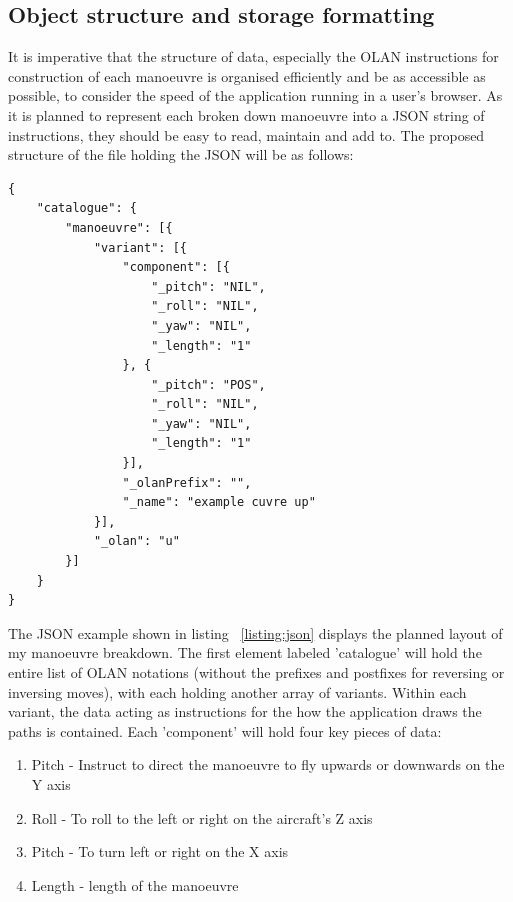 \subsection{Object structure and storage formatting}
It is imperative that the structure of data, especially the OLAN instructions for construction of each manoeuvre is organised efficiently and be as accessible as possible, to consider the speed of the application running in a user's browser. As it is planned to represent each broken down manoeuvre into a JSON string of instructions, they should be easy to read, maintain and add to. The proposed structure of the file holding the JSON will be as follows:

\lstset{language=JavaScript}
\medskip
\begin{lstlisting}[caption=A JSON means of holding break downs of manouvres with each one holding information on different variants of the move such as inverse and reverse and description of the OLAN notation]
{
    "catalogue": {
        "manoeuvre": [{
            "variant": [{
                "component": [{
                    "_pitch": "NIL",
                    "_roll": "NIL",
                    "_yaw": "NIL",
                    "_length": "1"
                }, {
                    "_pitch": "POS",
                    "_roll": "NIL",
                    "_yaw": "NIL",
                    "_length": "1"
                }],
                "_olanPrefix": "",
                "_name": "example cuvre up"
            }],
            "_olan": "u"
       	}]
   	}
}
\end{lstlisting}
\label{listing:json}

The JSON example shown in listing ~\ref{listing:json} displays the planned layout of my manoeuvre breakdown. The first element labeled 'catalogue' will hold the entire list of OLAN notations (without the prefixes and postfixes for reversing or inversing moves), with each holding another array of variants. Within each variant, the data acting as instructions for the how the application draws the paths is contained. Each 'component' will hold four key pieces of data:

\begin{enumerate}
	\item Pitch - Instruct to direct the manoeuvre to fly upwards or downwards on the Y axis
	\item Roll - To roll to the left or right on the aircraft's Z axis
	\item Pitch - To turn left or right on the X axis
	\item Length - length of the manoeuvre
\end{enumerate}

